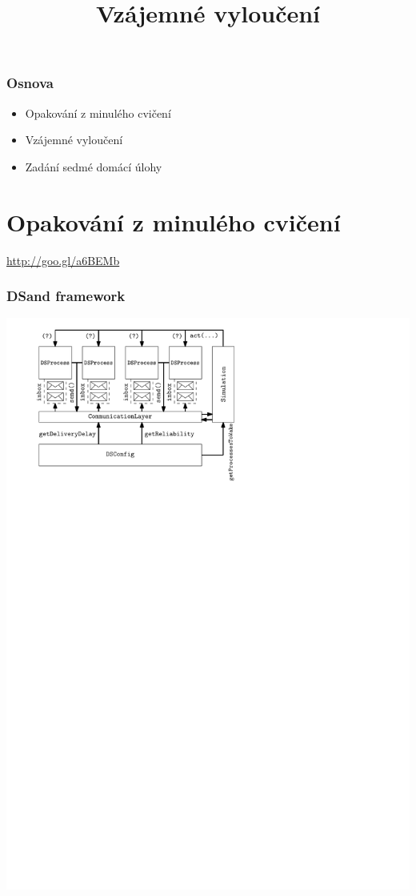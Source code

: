 \documentclass[usenames,dvipsnames,9pt]{beamer}
\title{Vzájemné vyloučení}
\date{}
\institute{B4B36PDV -- Paralelní a distribuované výpočty}
\begin{document}
\maketitle

\begin{frame}
  \frametitle{Osnova}
  \begin{itemize}
    \item Opakování z minulého cvičení\\[1.5em]
    \item Vzájemné vyloučení\\[1.5em]
    \item Zadání sedmé domácí úlohy
  \end{itemize}
\end{frame}


\section{Opakování z minulého cvičení}

\begin{frame}[standout]
 \vspace{3em}

 \Huge
 \url{http://goo.gl/a6BEMb}
\end{frame}

\begin{frame}
\frametitle{DSand framework}
\centering\includegraphics[width=0.8\linewidth]{11/figs/dsand.pdf}
\end{frame}
\end{document}
